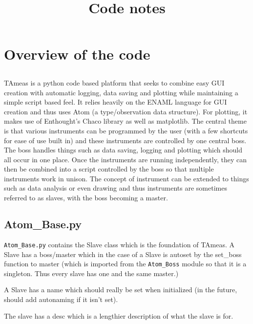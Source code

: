 \documentclass[12pt,a4paper]{article}
\begin{document}

\title{Code notes}
\maketitle
\noindent


\section{Overview of the code}

\subsection{}
TAmeas is a python code based platform that seeks to combine easy GUI creation with automatic logging, data saving and plotting while maintaining a simple script based feel. It relies heavily on the ENAML language for GUI creation and thus uses Atom (a type/observation data structure). For plotting, it makes use of Enthought's Chaco library as well as matplotlib. The central theme is that various instruments can be programmed by the user (with a few shortcuts for ease of use built in) and these instruments are controlled by one central boss. The boss handles things such as data saving, logging and plotting which should all occur in one place. Once the instruments are running independently, they can then be combined into a script controlled by the boss so that multiple instruments work in unison. The concept of instrument can be extended to things such as data analysis or even drawing and thus instruments are sometimes referred to as slaves, with the boss becoming a master.


\subsection{Atom\_Base.py}

\verb;Atom_Base.py;
 contains the Slave class which is the foundation of TAmeas. A Slave has a boss/master which in the case of a Slave is autoset by the set\_boss function to master (which is imported from the \verb;Atom_Boss; module so that it is a singleton. Thus every slave has one and the same master.)

A Slave has a name which should really be set when initialized (in the future, should add autonaming if it isn't set).

The slave has a desc which is a lengthier description of what the slave is for.
\end{document}
